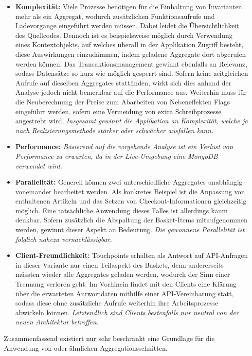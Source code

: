 \begin{itemize}[topsep=-2pt]
	\item \textbf{Komplexität: } {Viele Prozesse benötigen für die Einhaltung von Invarianten mehr als ein Aggregat, wodurch zusätzlichen Funktionsaufrufe und Ladevorgänge eingeführt werden müssen. Dabei leidet die Übersichtlichkeit des Quellcodes. Dennoch ist es beispielsweise möglich durch Verwendung eines Kontextobjekts, auf welches überall in der Applikation Zugriff besteht, diese Auswirkungen einzudämmen, indem geladene Aggregate dort abgerufen werden können. Das Transaktionsmanagement gewinnt ebenfalls an Relevanz, sodass Datensätze so kurz wie möglich gesperrt sind. Sofern keine zeitgleichen Aufrufe auf dieselben Aggregates stattfinden, wirkt sich dies anhand der Analyse jedoch nicht bemerkbar auf die Performance aus. Weiterhin muss für die Neuberechnung der Preise zum Abarbeiten von Nebeneffekten Flags eingeführt werden, sofern eine Vermeidung von extra Schreibprozesse angestrebt wird. \emph{Insgesamt gewinnt die Applikation an Komplexität, welche je nach Realisierungsmethode stärker oder schwächer ausfallen kann.}}

	\item \textbf{Performance: } { \emph{Basierend auf die vorgehende Analyse ist ein Verlust von Performance zu erwarten, da in der Live-Umgebung eine MongoDB verwendet wird.} }
	
	\item \textbf{Parallelität: } { Generell können zwei unterschiedliche Aggregates unabhängig voneinander bearbeitet werden. Als konkretes Beispiel ist die Anpassung von enthaltenen Artikeln und das Setzen von Checkout-Informationen gleichzeitig möglich. Eine tatsächliche Anwendung dieses Falles ist allerdings kaum denkbar. Sofern zusätzlich die Abspaltung der Basket-Items mitaufgenommen werden, gewinnt dieser Aspekt an Bedeutung. \emph{Die gewonnene Parallelität ist folglich nahezu vernachlässigbar.}}
	\item \textbf{Client-Freundlichkeit: } { Touchpoints erhalten als Antwort auf API-Anfragen in dieser Variante nur einen Teilaspekt des Baskets, denn andererseits müssten wieder alle Aggregates geladen werden, wodurch der Sinn einer Trennung verloren geht. Im Vorhinein findet mit den Clients eine Klärung über die erwarteten Antwortdaten mithilfe einer API-Vereinbarung statt, sodass diese ohne zusätzliche Aufrufe weiterhin ihre Arbeitsprozesse abwickeln können. \emph{Letztendlich sind Clients bestenfalls nur neutral von der neuen Architektur betroffen.}}
\end{itemize}

Zusammenfassend existiert nur sehr beschränkt eine Grundlage für die Anwendung von  oder ähnlichen Aggregationsschnitten.